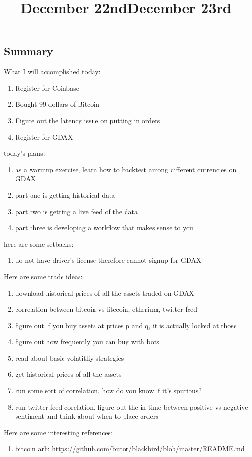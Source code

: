 \title{December 22nd}

\subsection{Summary}

What I will accomplished today:

\begin{enumerate}
	\item Register for Coinbase
	\item Bought 99 dollars of Bitcoin
	\item Figure out the latency issue on putting in orders
	\item Register for GDAX
\end{enumerate}


\title{December 23rd}

today's plans:

\begin{enumerate}
	\item as a warmup exercise, learn how to backtest among different currencies on GDAX
	\item part one is getting historical data
	\item part two is getting a live feed of the data
	\item part three is developing a workflow that makes sense to you
\end{enumerate}

here are some setbacks:

\begin{enumerate}
	\item do not have driver's license therefore cannot signup for GDAX
\end{enumerate}


Here are some trade ideas:

\begin{enumerate}
	\item download historical prices of all the assets traded on GDAX
	\item correlation between bitcoin vs {litecoin, etherium, twitter feed}
	\item figure out if you buy assets at prices p and q, it is actually locked at those 
	\item figure out how frequently you can buy with bots
	\item read about basic volatitliy strategies
	\item get historical prices of all the assets
	\item run some sort of correlation, how do you know if it's spurious?
	\item run twitter feed corelation, figure out the in time between positive vs negative
	  sentiment and think about when to place orders
\end{enumerate}

Here are some interesting references:

\begin{enumerate}
	\item bitcoin arb: https://github.com/butor/blackbird/blob/master/README.md
\end{enumerate}
